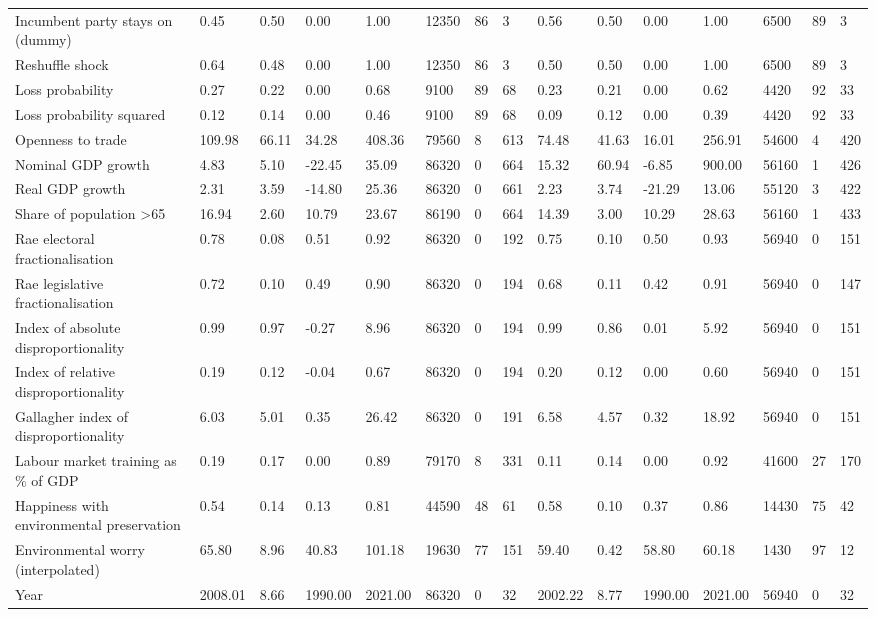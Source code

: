 \begin{longtable}{lllllllllllllll}
Incumbent party stays on (dummy) & 0.45 & 0.50 & 0.00 & 1.00 & 12350 & 86 & 3 & 0.56 & 0.50 & 0.00 & 1.00 & 6500 & 89 & 3\\
Reshuffle shock & 0.64 & 0.48 & 0.00 & 1.00 & 12350 & 86 & 3 & 0.50 & 0.50 & 0.00 & 1.00 & 6500 & 89 & 3\\
Loss probability & 0.27 & 0.22 & 0.00 & 0.68 & 9100 & 89 & 68 & 0.23 & 0.21 & 0.00 & 0.62 & 4420 & 92 & 33\\
\addlinespace
Loss probability squared & 0.12 & 0.14 & 0.00 & 0.46 & 9100 & 89 & 68 & 0.09 & 0.12 & 0.00 & 0.39 & 4420 & 92 & 33\\
Openness to trade & 109.98 & 66.11 & 34.28 & 408.36 & 79560 & 8 & 613 & 74.48 & 41.63 & 16.01 & 256.91 & 54600 & 4 & 420\\
Nominal GDP growth & 4.83 & 5.10 & -22.45 & 35.09 & 86320 & 0 & 664 & 15.32 & 60.94 & -6.85 & 900.00 & 56160 & 1 & 426\\
Real GDP growth & 2.31 & 3.59 & -14.80 & 25.36 & 86320 & 0 & 661 & 2.23 & 3.74 & -21.29 & 13.06 & 55120 & 3 & 422\\
Share of population >65 & 16.94 & 2.60 & 10.79 & 23.67 & 86190 & 0 & 664 & 14.39 & 3.00 & 10.29 & 28.63 & 56160 & 1 & 433\\
\addlinespace
Rae electoral fractionalisation & 0.78 & 0.08 & 0.51 & 0.92 & 86320 & 0 & 192 & 0.75 & 0.10 & 0.50 & 0.93 & 56940 & 0 & 151\\
Rae legislative fractionalisation & 0.72 & 0.10 & 0.49 & 0.90 & 86320 & 0 & 194 & 0.68 & 0.11 & 0.42 & 0.91 & 56940 & 0 & 147\\
Index of absolute disproportionality & 0.99 & 0.97 & -0.27 & 8.96 & 86320 & 0 & 194 & 0.99 & 0.86 & 0.01 & 5.92 & 56940 & 0 & 151\\
Index of relative disproportionality & 0.19 & 0.12 & -0.04 & 0.67 & 86320 & 0 & 194 & 0.20 & 0.12 & 0.00 & 0.60 & 56940 & 0 & 151\\
Gallagher index of disproportionality & 6.03 & 5.01 & 0.35 & 26.42 & 86320 & 0 & 191 & 6.58 & 4.57 & 0.32 & 18.92 & 56940 & 0 & 151\\
\addlinespace
Labour market training as \% of GDP & 0.19 & 0.17 & 0.00 & 0.89 & 79170 & 8 & 331 & 0.11 & 0.14 & 0.00 & 0.92 & 41600 & 27 & 170\\
Happiness with environmental preservation & 0.54 & 0.14 & 0.13 & 0.81 & 44590 & 48 & 61 & 0.58 & 0.10 & 0.37 & 0.86 & 14430 & 75 & 42\\
Environmental worry (interpolated) & 65.80 & 8.96 & 40.83 & 101.18 & 19630 & 77 & 151 & 59.40 & 0.42 & 58.80 & 60.18 & 1430 & 97 & 12\\
Year & 2008.01 & 8.66 & 1990.00 & 2021.00 & 86320 & 0 & 32 & 2002.22 & 8.77 & 1990.00 & 2021.00 & 56940 & 0 & 32\\
\bottomrule
\end{longtable}
